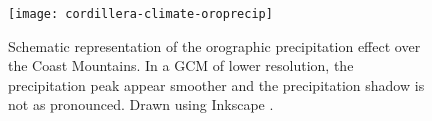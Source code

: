 \begin{figure}[t]
	\vspace*{2mm}
	\begin{center}
		\texttt{[image: cordillera-climate-oroprecip]}
	\end{center}
	\caption{Schematic representation of the orographic precipitation effect over the Coast Mountains. In a GCM of lower resolution, the precipitation peak appear smoother and the precipitation shadow is not as pronounced. Drawn using Inkscape \citep{web:inkscape}.}
	\label{fig:oroprecip}
\end{figure}

